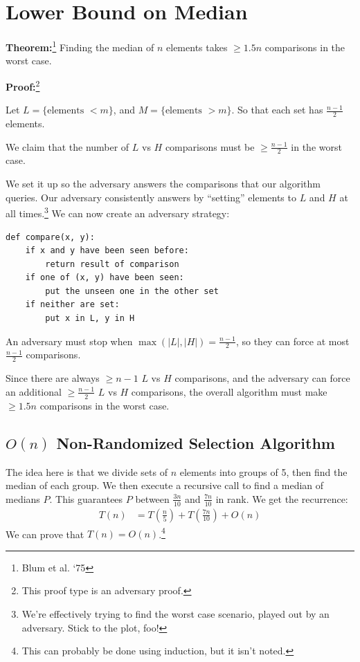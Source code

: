             \section{Lower Bound on Median} %
            \label{sec:lower_bound_on_median}
                \textbf{Theorem:}\footnote{Blum et al. `75}
                Finding the median of $n$ elements takes $\ge 1.5n$ comparisons in the worst case.

                \textbf{Proof:}\footnote{This proof type is an adversary proof.}

                Let $L = \{\text{elements } < m\}$, and $M = \{\text{elements } > m\}$.
                So that each set has $\frac{n-1}{2}$ elements.

                We claim that the number of $L$ vs $H$ comparisons must be $\ge \frac{n-1}{2}$ in the worst case.

                We set it up so the adversary answers the comparisons that our algorithm queries.
                Our adversary consistently answers by ``setting'' elements to $L$ and $H$ at all times.\footnote{We're effectively trying to find the worst case scenario, played out by an adversary. Stick to the plot, foo!}
                We can now create an adversary strategy:
                \begin{verbatim}
def compare(x, y):
    if x and y have been seen before:
        return result of comparison
    if one of (x, y) have been seen:
        put the unseen one in the other set
    if neither are set:
        put x in L, y in H
                \end{verbatim}
                An adversary must stop when $\max(|L|, |H|) = \frac{n-1}{2}$, so they can force at most $\frac{n-1}{2}$ comparisons.

                Since there are always $\ge n-1$ $L$ vs $H$ comparisons, and the adversary can force an additional $\ge \frac{n-1}{2}$ $L$ vs $H$ comparisons, the overall algorithm must make $\ge 1.5n$ comparisons in the worst case.

                \subsection{$O(n)$ Non-Randomized Selection Algorithm} %
                \label{sub:on_non_randomized_selection_algorithm}
                    The idea here is that we divide sets of $n$ elements into groups of 5, then find the median of each group.
                    We then execute a recursive call to find a median of medians $P$.
                    This guarantees $P$ between $\frac{3n}{10}$ and $\frac{7n}{10}$ in rank.
                    We get the recurrence:
                    \begin{align*}
                        T(n) &= T\left(\frac{n}{5}\right) + T\left(\frac{7n}{10}\right) + O(n)
                    \end{align*}
                    We can prove that $T(n) = O(n)$.\footnote{This can probably be done using induction, but it isn't noted.}

